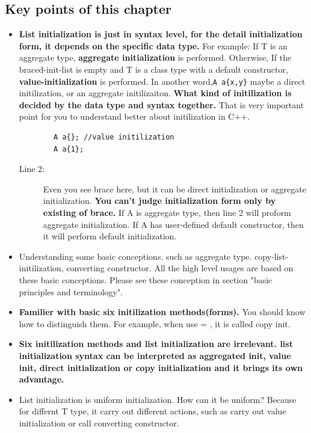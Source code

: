 \documentclass[a4paper,11pt,twoside]{book}
\begin{document}
\subsection{Key points of this chapter}
\begin{itemize}
	
	\item \textbf{List initialization is just in syntax level, for the detail initialization form, it depends on the specific data type.}  For example: If T is an aggregate type, \textbf{aggregate initialization} is performed. Otherwise, If the braced-init-list is empty and T is a class type with a default constructor, \textbf{value-initialization} is performed. In another word,\texttt{A a\{x,y\}} maybe a direct initilization, or an aggregate initilizaiton. \textbf{What kind of initilization is decided by the data type and syntax together.} That is very important point for you to understand better about initilization in C++.
	\begin{lstlisting}
		A a{}; //value initilization
		A a{1};	
	\end{lstlisting}
	\begin{description}
		\item[Line 2:] Even you see brace here, but it can be direct initialization or aggregate initialization. \textbf{You can't judge initialization form only by existing of brace.} If A is aggregate type, then line 2 will proform aggregate initialization. If A has user-defined default constructor, then it will perform default initialization. 
	\end{description}
	
	
	\item Understanding some basic conceptions. such as aggregate type. copy-list-initilization, converting constructor. All the high level usages are based on these basic conceptions. Please see these conception in section "basic principles and terminology".
	
	\item \textbf{Familier with basic six initilization methods(forms).} You should know how to distinguish them. For example, when use = , it is called copy init. 
	
	\item \textbf{Six initilization methods and list initialization are irrelevant. list initialization syntax can be interpreted as aggregated init, value init, direct initialization or copy initialization and it brings its own advantage.} 
	
	\item List initialization is uniform initialization. How can it be uniform? Because for differnt T type, it carry out different actions, such as carry out value initialization or call converting constructor.


\end{itemize}
\end{document}
